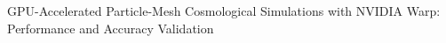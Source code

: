 \documentclass[]{article}
\begin{document}
GPU-Accelerated Particle-Mesh Cosmological Simulations with NVIDIA Warp: Performance and Accuracy Validation
\end{document}
